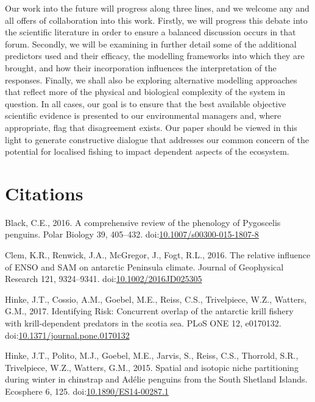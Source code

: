 \documentclass[]{elsarticle} %
\begin{document}
Our work into the future will progress along three lines, and we welcome
any and all offers of collaboration into this work. Firstly, we will
progress this debate into the scientific literature in order to ensure a
balanced discussion occurs in that forum. Secondly, we will be examining
in further detail some of the additional predictors used and their
efficacy, the modelling frameworks into which they are brought, and how
their incorporation influences the interpretation of the responses.
Finally, we shall also be exploring alternative modelling approaches
that reflect more of the physical and biological complexity of the
system in question. In all cases, our goal is to ensure that the best
available objective scientific evidence is presented to our
environmental managers and, where appropriate, flag that disagreement
exists. Our paper should be viewed in this light to generate
constructive dialogue that addresses our common concern of the potential
for localised fishing to impact dependent aspects of the ecosystem.\\
\newpage  

\hypertarget{citations}{%
\section{Citations}\label{citations}}

\hypertarget{refs}{}
\leavevmode\hypertarget{ref-Black2016}{}%
Black, C.E., 2016. A comprehensive review of the phenology of Pygoscelis
penguins. Polar Biology 39, 405--432.
doi:\href{https://doi.org/10.1007/s00300-015-1807-8}{10.1007/s00300-015-1807-8}

\leavevmode\hypertarget{ref-Clem2016}{}%
Clem, K.R., Renwick, J.A., McGregor, J., Fogt, R.L., 2016. The relative
influence of ENSO and SAM on antarctic Peninsula climate. Journal of
Geophysical Research 121, 9324--9341.
doi:\href{https://doi.org/10.1002/2016JD025305}{10.1002/2016JD025305}

\leavevmode\hypertarget{ref-Hinke2017}{}%
Hinke, J.T., Cossio, A.M., Goebel, M.E., Reiss, C.S., Trivelpiece, W.Z.,
Watters, G.M., 2017. Identifying Risk: Concurrent overlap of the
antarctic krill fishery with krill-dependent predators in the scotia
sea. PLoS ONE 12, e0170132.
doi:\href{https://doi.org/10.1371/journal.pone.0170132}{10.1371/journal.pone.0170132}

\leavevmode\hypertarget{ref-Hinke2015}{}%
Hinke, J.T., Polito, M.J., Goebel, M.E., Jarvis, S., Reiss, C.S.,
Thorrold, S.R., Trivelpiece, W.Z., Watters, G.M., 2015. Spatial and
isotopic niche partitioning during winter in chinstrap and Adélie
penguins from the South Shetland Islands. Ecosphere 6, 125.
doi:\href{https://doi.org/10.1890/ES14-00287.1}{10.1890/ES14-00287.1}
\end{document}
